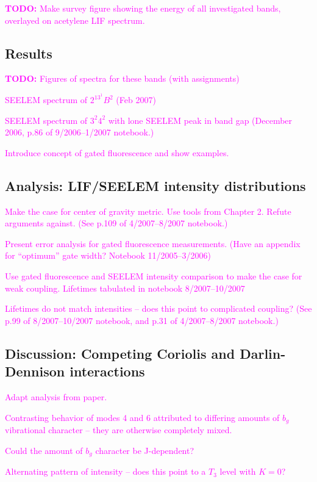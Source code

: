 \documentclass[12pt]{mitthesis}
\newcommand{\TODO} [1]{\textcolor{magenta}{\textbf{TODO:} #1}}
\newcommand{\POINT}[1]{\textcolor{magenta}{#1}}
\begin{document}
\TODO{Make survey figure showing the energy of all investigated bands,
  overlayed on acetylene LIF spectrum.}

\subsection{Results}

\TODO{Figures of spectra for these bands (with assignments)}

\POINT{SEELEM spectrum of $2^13^1B^2$ (Feb 2007)}

\POINT{SEELEM spectrum of $3^2 4^2$ with lone SEELEM peak in band gap
  (December 2006, p.86 of 9/2006--1/2007 notebook.)}

\POINT{Introduce concept of gated fluorescence and show examples.}

\subsection{Analysis: LIF/SEELEM intensity distributions}

\POINT{Make the case for center of gravity metric. Use tools from
  Chapter 2.  Refute arguments against.  (See p.109 of 4/2007--8/2007
  notebook.)}

\POINT{Present error analysis for gated fluorescence
  measurements. (Have an appendix for ``optimum'' gate width? Notebook
  11/2005--3/2006)}

\POINT{Use gated fluorescence and SEELEM intensity comparison to make
  the case for weak coupling. Lifetimes tabulated in notebook
  8/2007--10/2007}

\POINT{Lifetimes do not match intensities -- does this point to
  complicated coupling?  (See p.99 of 8/2007--10/2007 notebook, and
  p.31 of 4/2007--8/2007 notebook.)}

\subsection{Discussion: Competing Coriolis and Darlin-Dennison
  interactions}

\POINT{Adapt analysis from paper.}

\POINT{Contrasting behavior of modes 4 and 6 attributed to differing
  amounts of $b_g$ vibrational character -- they are otherwise
  completely mixed.}

\POINT{Could the amount of $b_g$ character be J-dependent?}

\POINT{Alternating pattern of intensity -- does this point to a $T_3$
  level with $K=0$?}
\end{document}
